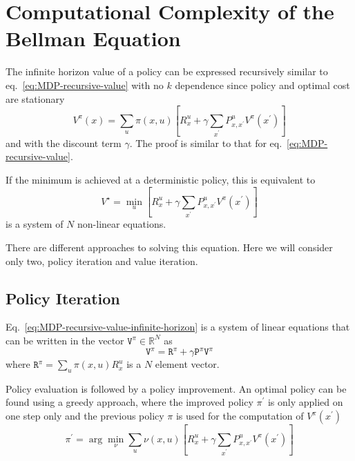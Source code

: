 \section{Computational Complexity of the Bellman Equation}
\label{sec:MDP-computation-complexity-bellman-eq}

The infinite horizon value of a policy can be expressed recursively similar to eq.~\eqref{eq:MDP-recursive-value} with no $k$ dependence since policy and optimal cost are stationary
\begin{equation}
  \label{eq:MDP-recursive-value-infinite-horizon}
  V^\pi(x) = \sum_u \pi(x,u)\left[R^u_x + \gamma \sum_{x^\prime}P^u_{x,x^\prime} V^\pi(x^\prime)\right]
\end{equation}
and with the discount term $\gamma$. The proof is similar to that for eq.~\eqref{eq:MDP-recursive-value}.

If the minimum is achieved at a deterministic policy, this is equivalent to
\begin{equation*}
  V^\star = \min_u \left[R^u_x + \gamma \sum_{x^\prime}P^u_{x,x^\prime} V^\pi(x^\prime)\right]
\end{equation*}
is a system of $N$ non-linear equations.


There are different approaches to solving this equation. Here we will consider only two, policy iteration and value iteration.

\subsection{Policy Iteration}
\label{sec:MDP-policy-iteration}

Eq.~\eqref{eq:MDP-recursive-value-infinite-horizon} is a system of linear equations that can be written in the vector $\mathtt{V}^\pi\in\mathbb{R}^N$ as
\begin{equation*}
  \mathtt{V}^\pi = \mathtt{R}^\pi + \gamma \mathtt{P}^\pi \mathtt{V}^\pi
\end{equation*}
where $\mathtt{R}^\pi = \sum_u \pi(x,u)R_x^u$ is a $N$ element vector.

Policy evaluation is followed by a policy improvement. An optimal policy can be found using a greedy approach, where the improved policy $\pi^\prime$ is only applied on one step only and the previous policy $\pi$ is used for the computation of $V^\pi(x^\prime)$
\begin{equation}
  \label{eq:MDP-policy-improvement}
  \pi^\prime = \arg \min_\nu \sum_u \nu(x,u)\left[R^u_x + \gamma \sum_{x^\prime}P^u_{x,x^\prime} V^\pi(x^\prime)\right]
\end{equation}

